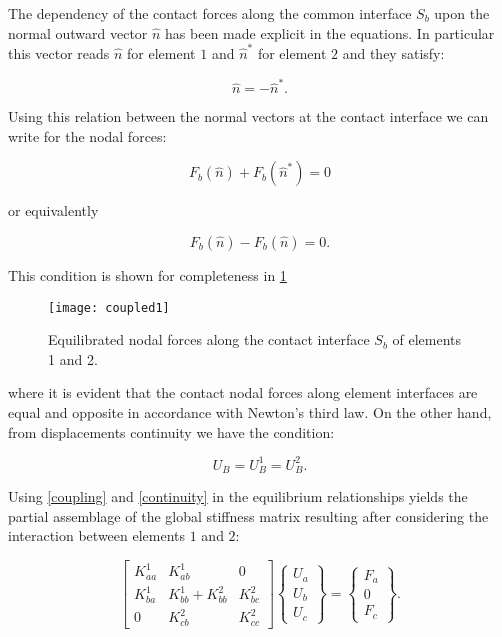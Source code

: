 The dependency of the contact forces along the common interface $S_b$ upon the normal outward vector $\widehat{n}$ has been made explicit in the equations. In particular this vector reads $\widehat n$ for element $1$ and ${\widehat n}^*$ for element $2$ and they satisfy:

\[\widehat n = - {\widehat n}^* . \]

Using this relation between the normal vectors at the contact interface we can write for the nodal forces:

\[ 
F_b(\widehat{n})+F_b({\widehat{n} }^*)=0
\]

or equivalently

\begin{equation}
F_b(\widehat n)-F_b(\widehat n)=0.
\label{coupling}
\end{equation}


This condition is shown for completeness in \cref{fig:coupled1}

\begin{figure}[H]
\centering
\texttt{[image: coupled1]}
\caption{Equilibrated nodal forces along the contact interface $S_b$ of elements 1 and 2.}
\label{fig:coupled1}
\end{figure}

where it is evident that the contact nodal forces along element interfaces are equal and opposite in accordance with Newton's third law. On the other hand, from displacements continuity we have the condition:

\begin{equation}
U_B = U_B^1 = U_B^2.
\label{continuity}
\end{equation}

Using \cref{coupling} and \cref{continuity} in the equilibrium relationships yields the partial assemblage of the global stiffness matrix resulting after considering the interaction between elements $1$ and $2$:

\begin{equation}
\begin{bmatrix}K_{aa}^1&K_{ab}^1&0\\K_{ba}^1&K_{bb}^1+K_{bb}^2&K_{bc}^2\\0&K_{cb}^2&K_{cc}^2\end{bmatrix}\begin{Bmatrix}U_a\\U_b\\U_c\end{Bmatrix}=\begin{Bmatrix}F_a\\0\\F_c\end{Bmatrix}.
\label{finaleq}
\end{equation}

